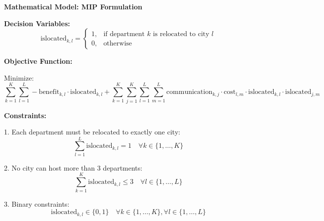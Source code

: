 \documentclass{article}
\begin{document}
\textbf{Mathematical Model: MIP Formulation}

\textbf{Decision Variables:}
\[
\text{islocated}_{k, l} = 
\begin{cases} 
1, & \text{if department } k \text{ is relocated to city } l \\
0, & \text{otherwise}
\end{cases}
\]

\textbf{Objective Function:}

Minimize:
\[
\sum_{k=1}^{K} \sum_{l=1}^{L} -\text{benefit}_{k, l} \cdot \text{islocated}_{k, l} 
+ \sum_{k=1}^{K} \sum_{j=1}^{K} \sum_{l=1}^{L} \sum_{m=1}^{L} \text{communication}_{k, j} \cdot \text{cost}_{l, m} \cdot \text{islocated}_{k, l} \cdot \text{islocated}_{j, m}
\]

\textbf{Constraints:}

1. Each department must be relocated to exactly one city:
\[
\sum_{l=1}^{L} \text{islocated}_{k, l} = 1 \quad \forall k \in \{1, \ldots, K\}
\]

2. No city can host more than 3 departments:
\[
\sum_{k=1}^{K} \text{islocated}_{k, l} \leq 3 \quad \forall l \in \{1, \ldots, L\}
\]

3. Binary constraints:
\[
\text{islocated}_{k, l} \in \{0, 1\} \quad \forall k \in \{1, \ldots, K\}, \forall l \in \{1, \ldots, L\}
\]
\end{document}
